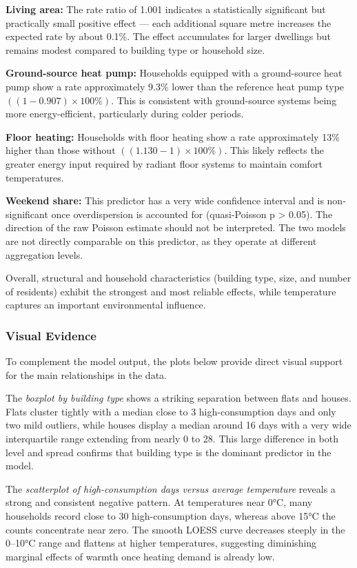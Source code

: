\documentclass[
]{article}
\begin{document}
\textbf{Living area:} The rate ratio of 1.001 indicates a statistically
significant but practically small positive effect --- each additional
square metre increases the expected rate by about 0.1\%. The effect
accumulates for larger dwellings but remains modest compared to building
type or household size.

\textbf{Ground-source heat pump:} Households equipped with a
ground-source heat pump show a rate approximately 9.3\% lower than the
reference heat pump type \(((1 -
0.907) \times 100\%)\). This is consistent with ground-source systems
being more energy-efficient, particularly during colder periods.

\textbf{Floor heating:} Households with floor heating show a rate
approximately 13\% higher than those without
\(((1.130 - 1) \times 100\%)\). This likely reflects the greater energy
input required by radiant floor systems to maintain comfort
temperatures.

\textbf{Weekend share:} This predictor has a very wide confidence
interval and is non-significant once overdispersion is accounted for
(quasi-Poisson p \textgreater{} 0.05). The direction of the raw Poisson
estimate should not be interpreted. The two models are not directly
comparable on this predictor, as they operate at different aggregation
levels.

Overall, structural and household characteristics (building type, size,
and number of residents) exhibit the strongest and most reliable
effects, while temperature captures an important environmental
influence.

\subsubsection{Visual Evidence}\label{visual-evidence-1}

To complement the model output, the plots below provide direct visual
support for the main relationships in the data.

The \emph{boxplot by building type} shows a striking separation between
flats and houses. Flats cluster tightly with a median close to 3
high-consumption days and only two mild outliers, while houses display a
median around 16 days with a very wide interquartile range extending
from nearly 0 to 28. This large difference in both level and spread
confirms that building type is the dominant predictor in the model.

The \emph{scatterplot of high-consumption days versus average
temperature} reveals a strong and consistent negative pattern. At
temperatures near 0°C, many households record close to 30
high-consumption days, whereas above 15°C the counts concentrate near
zero. The smooth LOESS curve decreases steeply in the 0--10°C range and
flattens at higher temperatures, suggesting diminishing marginal effects
of warmth once heating demand is already low.
\end{document}

